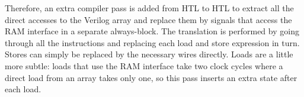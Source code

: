 
Therefore, an extra compiler pass is added from HTL to HTL to extract all the
direct accesses to the Verilog array and replace them by signals that access the
RAM interface in a separate always-block. The translation is performed by going
through all the instructions and replacing each load and store expression in
turn.  Stores can simply be replaced by the necessary wires directly. Loads are
a little more subtle: loads that use the RAM interface take two clock cycles
where a direct load from an array takes only one, so this pass inserts an extra
state after each load.


